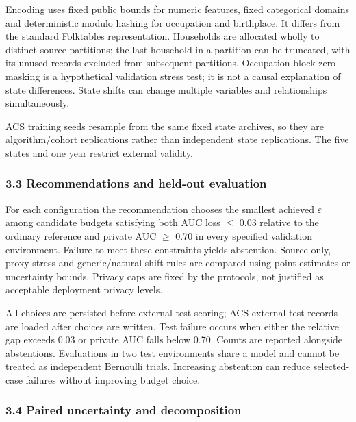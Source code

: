 \documentclass[
  10pt,
]{article}
\begin{document}
Encoding uses fixed public bounds for numeric features, fixed
categorical domains and deterministic modulo hashing for occupation and
birthplace. It differs from the standard Folktables representation.
Households are allocated wholly to distinct source partitions; the last
household in a partition can be truncated, with its unused records
excluded from subsequent partitions. Occupation-block zero masking is a
hypothetical validation stress test; it is not a causal explanation of
state differences. State shifts can change multiple variables and
relationships simultaneously.

ACS training seeds resample from the same fixed state archives, so they
are algorithm/cohort replications rather than independent state
replications. The five states and one year restrict external validity.

\hypertarget{recommendations-and-held-out-evaluation}{%
\subsubsection{3.3 Recommendations and held-out
evaluation}\label{recommendations-and-held-out-evaluation}}

For each configuration the recommendation chooses the smallest achieved
\(\varepsilon\) among candidate budgets satisfying both AUC loss
\(\leq\) 0.03 relative to the ordinary reference and private AUC
\(\geq\) 0.70 in every specified validation environment. Failure to meet
these constraints yields abstention. Source-only, proxy-stress and
generic/natural-shift rules are compared using point estimates or
uncertainty bounds. Privacy caps are fixed by the protocols, not
justified as acceptable deployment privacy levels.

All choices are persisted before external test scoring; ACS external
test records are loaded after choices are written. Test failure occurs
when either the relative gap exceeds 0.03 or private AUC falls below
0.70. Counts are reported alongside abstentions. Evaluations in two test
environments share a model and cannot be treated as independent
Bernoulli trials. Increasing abstention can reduce selected-case
failures without improving budget choice.

\hypertarget{paired-uncertainty-and-decomposition}{%
\subsubsection{3.4 Paired uncertainty and
decomposition}\label{paired-uncertainty-and-decomposition}}
\end{document}
